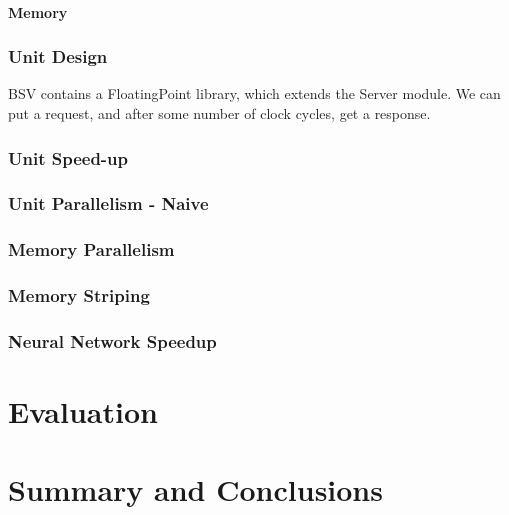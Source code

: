 \documentclass[a4paper,9pt]{report}
\begin{document}
\subsubsection{Memory}


\subsection{Unit Design} 
BSV contains a FloatingPoint library, which extends the Server module.
We can put a request, and after some number of clock cycles, get a response.


\subsection{Unit Speed-up}
\subsection{Unit Parallelism - Naive}
\subsection{Memory Parallelism}
\subsection{Memory Striping}

\subsection{Neural Network Speedup}


\chapter{Evaluation} 

\chapter{Summary and Conclusions} 


\appendix
\singlespacing

 
% 
\end{document}
